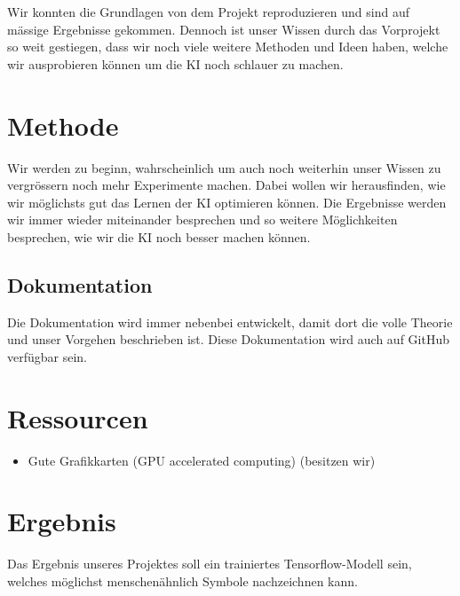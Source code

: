 \documentclass{article}
\begin{document}
Wir konnten die Grundlagen von dem Projekt reproduzieren und sind auf mässige
Ergebnisse gekommen. Dennoch ist unser Wissen durch das Vorprojekt so weit
gestiegen, dass wir noch viele weitere Methoden und Ideen haben, welche wir
ausprobieren können um die KI noch schlauer zu machen.

\section{Methode}
\label{chap:methode}

Wir werden zu beginn, wahrscheinlich um auch noch weiterhin unser Wissen zu
vergrössern noch mehr Experimente machen. Dabei wollen wir herausfinden, wie wir
möglichsts gut das Lernen der KI optimieren können. Die Ergebnisse werden wir
immer wieder miteinander besprechen und so weitere Möglichkeiten besprechen, wie
wir die KI noch besser machen können.


\subsection{Dokumentation}
\label{chap:m_dokumentation}
Die Dokumentation wird immer nebenbei entwickelt, damit dort die volle Theorie
und unser Vorgehen beschrieben ist. Diese Dokumentation wird auch auf GitHub
verfügbar sein.


\section{Ressourcen}
\label{chap:ressourcen}

\begin{itemize}
    \item Gute Grafikkarten (GPU accelerated computing) (besitzen wir)
\end{itemize}


\section{Ergebnis}
\label{chap:ergebnis}

Das Ergebnis unseres Projektes soll ein trainiertes Tensorflow-Modell sein,
welches möglichst menschenähnlich Symbole nachzeichnen kann.
\end{document}
